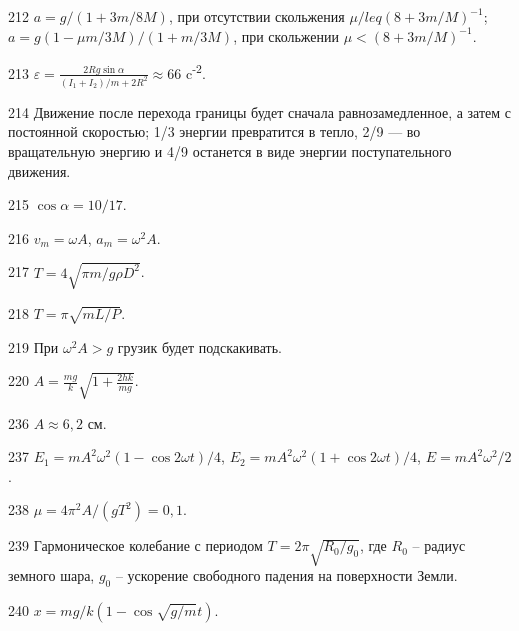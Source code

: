 \begin{Answer}{212}
$a = g/(1+3m/8M)$, при отсутствии скольжения $\mu /leq (8+3m/M)^{-1}$; $a = g(1 - \mu m/3M)/(1+m/3M)$, при скольжении $\mu < (8+3m/M)^{-1}$.
\end{Answer}
\begin{Answer}{213}
$\varepsilon = \frac{2Rg \sin \alpha}{(I_1 + I_2)/m + 2R^2} \approx 66$ c\textsuperscript{-2}.
\end{Answer}
\begin{Answer}{214}
Движение после перехода границы будет сначала равнозамедленное, а затем с постоянной скоростью; 1/3 энергии превратится в тепло, 2/9 — во вращательную энергию и 4/9 останется в виде энергии поступательного движения.
\end{Answer}
\begin{Answer}{215}
$\cos \alpha = 10/17$.
\end{Answer}
\begin{Answer}{216}
$v_m = \omega A$, $a_m = \omega^2 A$.
\end{Answer}
\begin{Answer}{217}
$T = 4 \sqrt{\pi m / g \rho D^2}$.
\end{Answer}
\begin{Answer}{218}
$T = \pi \sqrt{m L /P}$.
\end{Answer}
\begin{Answer}{219}
При $\omega^2 A > g$ грузик будет подскакивать.
\end{Answer}
\begin{Answer}{220}
$A = \frac{mg}{k}\sqrt{ 1 + \frac{2hk}{mg}}$.
\end{Answer}
\begin{Answer}{236}
$A \approx 6,2$ см.
\end{Answer}
\begin{Answer}{237}
$E_1 = m A^2 \omega^2 (1 - \cos 2 \omega t)/4$, $E_2 = m A^2 \omega^2 (1 + \cos 2 \omega t)/4$, $E = m A^2 \omega^2 /2$.
\end{Answer}
\begin{Answer}{238}
$\mu = 4 \pi^2 A / (gT^2) = 0,1$.
\end{Answer}
\begin{Answer}{239}
Гармоническое колебание с периодом $T = 2 \pi \sqrt{R_0 / g_0}$, где $R_0$ -- радиус земного шара, $g_0$ -- ускорение свободного падения на поверхности Земли.
\end{Answer}
\begin{Answer}{240}
$x = mg/k(1-\cos \sqrt{g/m} t)$.
\end{Answer}
